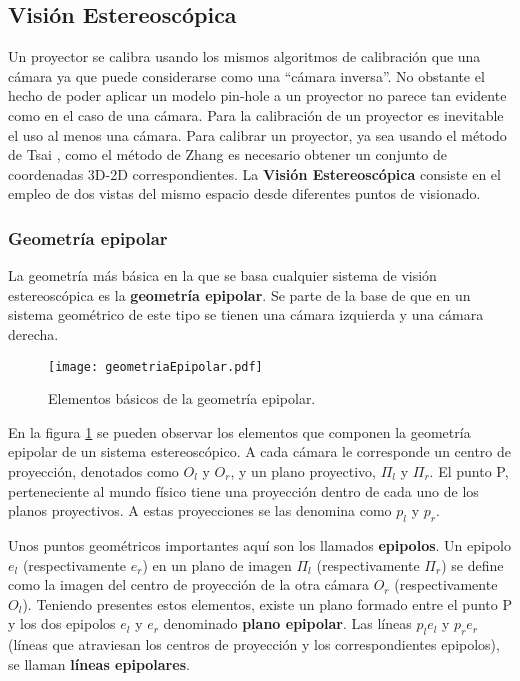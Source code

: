 %


\subsection{Visión Estereoscópica}

Un proyector se calibra usando los mismos algoritmos de calibración que una cámara ya que puede
considerarse como una ``cámara inversa''. No obstante el hecho de poder aplicar un modelo pin-hole
a un proyector no parece tan evidente como en el caso de una cámara. Para la calibración de un
proyector es inevitable el uso al menos una cámara. Para calibrar un proyector, ya sea usando el
método de Tsai \cite{Tsai}, como el método de Zhang \cite{Zhang99} es necesario obtener un conjunto
de coordenadas 3D-2D correspondientes. La \textbf{Visión Estereoscópica} consiste en el empleo de
dos vistas del mismo espacio desde diferentes puntos de visionado.

\subsubsection{Geometría epipolar}

La geometría más básica en la que se basa cualquier sistema de visión estereoscópica es la \textbf{geometría epipolar}. Se parte de la base de que en un sistema geométrico de este tipo se tienen una cámara izquierda y una cámara derecha.

\begin{figure}
  \centering
  \texttt{[image: geometriaEpipolar.pdf]}
  \caption{Elementos básicos de la geometría epipolar.}
  \label{fig:FIGgeomEpipolar}
\end{figure}


En la figura \ref{fig:FIGgeomEpipolar} se pueden observar los elementos que componen la geometría
epipolar de un sistema estereoscópico. A cada cámara le corresponde un centro de proyección,
denotados como $O_{l}$ y $O_{r}$, y un plano proyectivo, $\Pi_{l}$ y $\Pi_{r}$. El punto P,
perteneciente al mundo físico tiene una proyección dentro de cada uno de los planos proyectivos. A
estas proyecciones se las denomina como $p_{l}$ y $p_{r}$.


Unos puntos geométricos importantes aquí son los llamados \textbf{epipolos}. Un epipolo $e_l$ (res\-pectivamente $e_r$) en un plano de imagen $\Pi_{l}$ (respectivamente $\Pi_{r}$) se define como la imagen del centro de proyección de la otra cámara $O_{r}$ (respectivamente $O_{l}$). Teniendo presentes estos elementos, existe un plano formado entre el punto P y los dos epipolos $e_{l}$ y $e_{r}$ denominado \textbf{plano epipolar}. Las líneas $p_{l}e_{l}$ y $p_{r}e_{r}$ (líneas que atraviesan los centros de proyección y los correspondientes epipolos), se llaman \textbf{líneas epipolares}.

